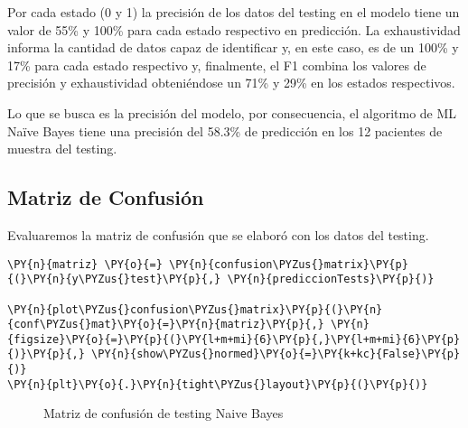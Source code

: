	Por cada estado (0 y 1) la precisión de los datos del testing en el modelo tiene un valor de 55\%  y 100\% para cada estado respectivo en predicción. La exhaustividad informa la cantidad de datos capaz de identificar y, en este caso, es de un 100\% y 17\% para cada estado respectivo y, finalmente, el F1 combina los valores de precisión y exhaustividad obteniéndose un 71\% y 29\% en los estados respectivos. 
\par Lo que se busca es la precisión del modelo, por consecuencia, el algoritmo de ML Naïve Bayes tiene una precisión del 58.3\% de predicción en los 12 pacientes de muestra del testing.\\

    \hypertarget{matriz-de-confusiuxf3n}{%
\subsection{Matriz de Confusión}\label{NBT:matriz-de-confusiuxf3n}}

	Evaluaremos la matriz de confusión que se elaboró con los datos del testing.

    \begin{tcolorbox}[breakable, size=fbox, boxrule=1pt, pad at break*=1mm,colback=cellbackground, colframe=cellborder]
\begin{Verbatim}[commandchars=\\\{\}]
\PY{n}{matriz} \PY{o}{=} \PY{n}{confusion\PYZus{}matrix}\PY{p}{(}\PY{n}{y\PYZus{}test}\PY{p}{,} \PY{n}{prediccionTests}\PY{p}{)}

\PY{n}{plot\PYZus{}confusion\PYZus{}matrix}\PY{p}{(}\PY{n}{conf\PYZus{}mat}\PY{o}{=}\PY{n}{matriz}\PY{p}{,} \PY{n}{figsize}\PY{o}{=}\PY{p}{(}\PY{l+m+mi}{6}\PY{p}{,}\PY{l+m+mi}{6}\PY{p}{)}\PY{p}{,} \PY{n}{show\PYZus{}normed}\PY{o}{=}\PY{k+kc}{False}\PY{p}{)}
\PY{n}{plt}\PY{o}{.}\PY{n}{tight\PYZus{}layout}\PY{p}{(}\PY{p}{)}
\end{Verbatim}
\end{tcolorbox}

\begin{center}
    	\begin{figure}[H]
	\centering
	\caption{Matriz de confusión de testing Naive Bayes}
	\label{fig:mctnb}
	\end{figure}
\end{center}
    
